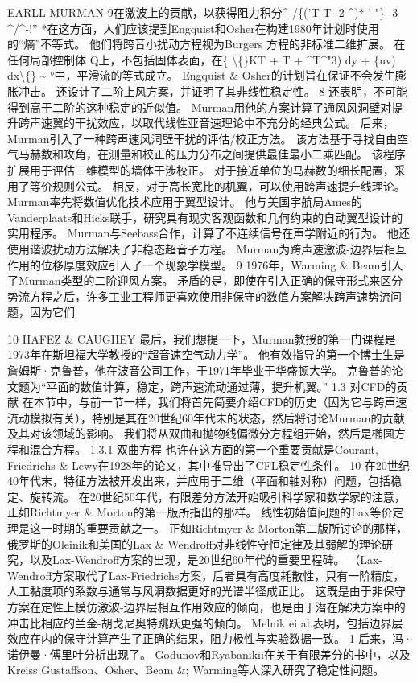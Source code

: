 \documentclass[UTF8,11pt,a4paper,openany,fontset=fandol]{ctexbook}
\begin{document}
EARLL MURMAN 9在激波上的贡献，以获得阻力积分\textasciicircum{}-/\{('T-T- 2 \textasciicircum{})*-'-"\}- 3 \textasciicircum{}/\textasciicircum{}-!” *在这方面，人们应该提到Engquist和Osher在构建1980年计划时使用的“熵”不等式。 他们将跨音小扰动方程视为Burgers 方程的非标准二维扩展。 在任何局部控制体 Q上，不包括固体表面，在\{ \textbackslash\{\}KT + T + \textasciicircum{}T\textasciicircum{}"3) dy + \{uv) dx\textbackslash\{\} \textasciitilde{} °中，平滑流的等式成立。 Engquist \& Osher的计划旨在保证不会发生膨胀冲击。 还设计了二阶上风方案，并证明了其非线性稳定性。 8 还表明，不可能得到高于二阶的这种稳定的近似值。 Murman用他的方案计算了通风风洞壁对提升跨声速翼的干扰效应，以取代线性亚音速理论中不充分的经典公式。 后来，Murman引入了一种跨声速风洞壁干扰的评估/校正方法。 该方法基于寻找自由空气马赫数和攻角，在测量和校正的压力分布之间提供最佳最小二乘匹配。 该程序扩展用于评估三维模型的墙体干涉校正。 对于接近单位的马赫数的细长配置，采用了等价规则公式。 相反，对于高长宽比的机翼，可以使用跨声速提升线理论。 Murman率先将数值优化技术应用于翼型设计。 他与美国宇航局Ames的Vanderplaats和Hicks联手，研究具有现实客观函数和几何约束的自动翼型设计的实用程序。 Murman与Seebass合作，计算了不连续信号在声学附近的行为。 他还使用谐波扰动方法解决了非稳态超音子方程。 Murman为跨声速激波-边界层相互作用的位移厚度效应引入了一个现象学模型。 9 1976年，Warming \& Beam引入了Murman类型的二阶迎风方案。 矛盾的是，即使在引入正确的保守形式来区分势流方程之后，许多工业工程师更喜欢使用非保守的数值方案解决跨声速势流问题，因为它们

10 HAFEZ \& CAUGHEY 最后，我们想提一下，Murman教授的第一门课程是1973年在斯坦福大学教授的“超音速空气动力学”。 他有效指导的第一个博士生是詹姆斯·克鲁普，他在波音公司工作，于1971年毕业于华盛顿大学。 克鲁普的论文题为“平面的数值计算，稳定，跨声速流动通过薄，提升机翼。” 1.3 对CFD的贡献 在本节中，与前一节一样，我们将首先简要介绍CFD的历史（因为它与跨声速流动模拟有关），特别是其在20世纪60年代末的状态，然后将讨论Murman的贡献及其对该领域的影响。 我们将从双曲和抛物线偏微分方程组开始，然后是椭圆方程和混合方程。 1.3.1 双曲方程 也许在这方面的第一个重要贡献是Courant, Friedrichs \& Lewy在1928年的论文，其中推导出了CFL稳定性条件。 10 在20世纪40年代末，特征方法被开发出来，并应用于二维（平面和轴对称）问题，包括稳定、旋转流。 在20世纪50年代，有限差分方法开始吸引科学家和数学家的注意，正如Richtmyer \& Morton的第一版所指出的那样。 线性初始值问题的Lax等价定理是这一时期的重要贡献之一。 正如Richtmyer \& Morton第二版所讨论的那样，俄罗斯的Oleinik和美国的Lax \& Wendroff对非线性守恒定律及其弱解的理论研究，以及Lax-Wendroff方案的出现，是20世纪60年代的重要里程碑。 （Lax-Wendroff方案取代了Lax-Friedrichs方案，后者具有高度耗散性，只有一阶精度，人工黏度项的系数与通常与风洞数据更好的光谱半径成正比。 这既是由于非保守方案在定性上模仿激波-边界层相互作用效应的倾向，也是由于潜在解决方案中的冲击比相应的兰金-胡戈尼奥特跳跃更强的倾向。 Melnik ei al.表明，包括边界层效应在内的保守计算产生了正确的结果，阻力极性与实验数据一致。 1 后来，冯·诺伊曼·傅里叶分析出现了。 Godunov和Ryabanikii在关于有限差分的书中，以及Kreiss Gustaffson、Osher、Beam \&; Warming等人深入研究了稳定性问题。
\end{document}
